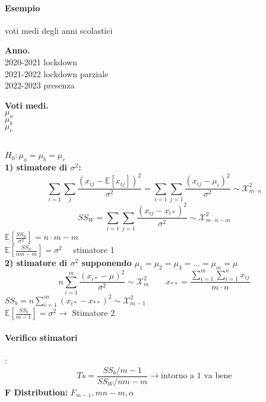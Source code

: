\documentclass[]{article}
\newcommand{\ev}{\mathbb{E}[X]}
\renewcommand{\ev}[1]{\mathbb{E}[#1]}
\begin{document}
    \paragraph{Esempio} voti medi degli anni scolastici \\[2ex]
    \begin{minipage}{0.45\textwidth}
        \textbf{Anno.} \\
        2020-2021 lockdown \\
        2021-2022 lockdown parziale \\
        2022-2023 presenza
    \end{minipage}
    \begin{minipage}{0.45\textwidth}
        \textbf{Voti medi.} \\
        $\mu_a$ \\
        $\mu_b$ \\
        $\mu_c$
    \end{minipage} \\[2ex]
    $H_0 : \mu_a = \mu_b = \mu_c$ \\[3ex]
    \textbf{1) stimatore di $\sigma^2$:} \\
    \[ \sum_{i=1}^{} \sum_{j}^{} \frac{(x_{ij} - \ev{x_{ij}})^2}{\sigma^2} = \sum_{i=1}^{} \sum_{j=1}^{} \frac{(x_{ij} - \mu_i)^2}{\sigma^2} \sim \mathcal{X}^2_{m\cdot n} \]
    \[ SS_W = \sum_{i=1}^{} \sum_{j=1}^{} \frac{(x_{ij} - x_{i*})^2}{\sigma^2} \sim \mathcal{X}^2_{m \cdot n - m} \]
    $\ev{\frac{SS_w}{\sigma^2}} = n \cdot m - m$ \\[2ex]
    $\ev{\frac{SS_w}{nm - m}} = \sigma^2 \quad$ stimatore 1 \\[4ex]
    \textbf{2) stimatore di $\sigma^2$ supponendo $\mu_1 = \mu_2 = \mu_3 = \ldots = \mu_m = \mu$}
    \[ n \sum_{i=1}^{m} \frac{(x_{i*} - \mu)^2}{\sigma^2} \sim \mathcal{X}^2_m \qquad x_{**} = \frac{\sum_{i=1}^{m} \sum_{i=1}^{n} x_{ij}}{m \cdot n} \]
    $SS_b = n \sum_{i = 1}^{m} (x_{i*} - x_{**})^2 \sim \mathcal{X}^2_{m-1}$ \\
    $\ev{\frac{SS_b}{m-1}} = \sigma^2 \rightarrow$ Stimatore 2
    \paragraph{Verifico stimatori}:
    \[ Ts = \frac{SS_b / m-1}{SS_W / nm - m} \rightarrow \text{intorno a 1 va bene}\]
    \textbf{F Distribution:} $F_{m-1}, mn - m, \alpha$
\end{document}
